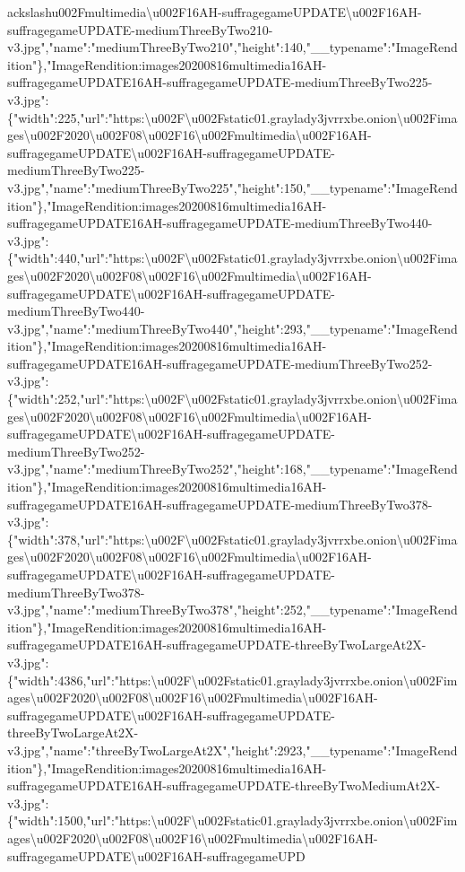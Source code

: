 ackslash{}u002Fmultimedia\textbackslash{}u002F16AH-suffragegameUPDATE\textbackslash{}u002F16AH-suffragegameUPDATE-mediumThreeByTwo210-v3.jpg","name":"mediumThreeByTwo210","height":140,"\_\_typename":"ImageRendition"\},"ImageRendition:images20200816multimedia16AH-suffragegameUPDATE16AH-suffragegameUPDATE-mediumThreeByTwo225-v3.jpg":\{"width":225,"url":"https:\textbackslash{}u002F\textbackslash{}u002Fstatic01.graylady3jvrrxbe.onion\textbackslash{}u002Fimages\textbackslash{}u002F2020\textbackslash{}u002F08\textbackslash{}u002F16\textbackslash{}u002Fmultimedia\textbackslash{}u002F16AH-suffragegameUPDATE\textbackslash{}u002F16AH-suffragegameUPDATE-mediumThreeByTwo225-v3.jpg","name":"mediumThreeByTwo225","height":150,"\_\_typename":"ImageRendition"\},"ImageRendition:images20200816multimedia16AH-suffragegameUPDATE16AH-suffragegameUPDATE-mediumThreeByTwo440-v3.jpg":\{"width":440,"url":"https:\textbackslash{}u002F\textbackslash{}u002Fstatic01.graylady3jvrrxbe.onion\textbackslash{}u002Fimages\textbackslash{}u002F2020\textbackslash{}u002F08\textbackslash{}u002F16\textbackslash{}u002Fmultimedia\textbackslash{}u002F16AH-suffragegameUPDATE\textbackslash{}u002F16AH-suffragegameUPDATE-mediumThreeByTwo440-v3.jpg","name":"mediumThreeByTwo440","height":293,"\_\_typename":"ImageRendition"\},"ImageRendition:images20200816multimedia16AH-suffragegameUPDATE16AH-suffragegameUPDATE-mediumThreeByTwo252-v3.jpg":\{"width":252,"url":"https:\textbackslash{}u002F\textbackslash{}u002Fstatic01.graylady3jvrrxbe.onion\textbackslash{}u002Fimages\textbackslash{}u002F2020\textbackslash{}u002F08\textbackslash{}u002F16\textbackslash{}u002Fmultimedia\textbackslash{}u002F16AH-suffragegameUPDATE\textbackslash{}u002F16AH-suffragegameUPDATE-mediumThreeByTwo252-v3.jpg","name":"mediumThreeByTwo252","height":168,"\_\_typename":"ImageRendition"\},"ImageRendition:images20200816multimedia16AH-suffragegameUPDATE16AH-suffragegameUPDATE-mediumThreeByTwo378-v3.jpg":\{"width":378,"url":"https:\textbackslash{}u002F\textbackslash{}u002Fstatic01.graylady3jvrrxbe.onion\textbackslash{}u002Fimages\textbackslash{}u002F2020\textbackslash{}u002F08\textbackslash{}u002F16\textbackslash{}u002Fmultimedia\textbackslash{}u002F16AH-suffragegameUPDATE\textbackslash{}u002F16AH-suffragegameUPDATE-mediumThreeByTwo378-v3.jpg","name":"mediumThreeByTwo378","height":252,"\_\_typename":"ImageRendition"\},"ImageRendition:images20200816multimedia16AH-suffragegameUPDATE16AH-suffragegameUPDATE-threeByTwoLargeAt2X-v3.jpg":\{"width":4386,"url":"https:\textbackslash{}u002F\textbackslash{}u002Fstatic01.graylady3jvrrxbe.onion\textbackslash{}u002Fimages\textbackslash{}u002F2020\textbackslash{}u002F08\textbackslash{}u002F16\textbackslash{}u002Fmultimedia\textbackslash{}u002F16AH-suffragegameUPDATE\textbackslash{}u002F16AH-suffragegameUPDATE-threeByTwoLargeAt2X-v3.jpg","name":"threeByTwoLargeAt2X","height":2923,"\_\_typename":"ImageRendition"\},"ImageRendition:images20200816multimedia16AH-suffragegameUPDATE16AH-suffragegameUPDATE-threeByTwoMediumAt2X-v3.jpg":\{"width":1500,"url":"https:\textbackslash{}u002F\textbackslash{}u002Fstatic01.graylady3jvrrxbe.onion\textbackslash{}u002Fimages\textbackslash{}u002F2020\textbackslash{}u002F08\textbackslash{}u002F16\textbackslash{}u002Fmultimedia\textbackslash{}u002F16AH-suffragegameUPDATE\textbackslash{}u002F16AH-suffragegameUPD